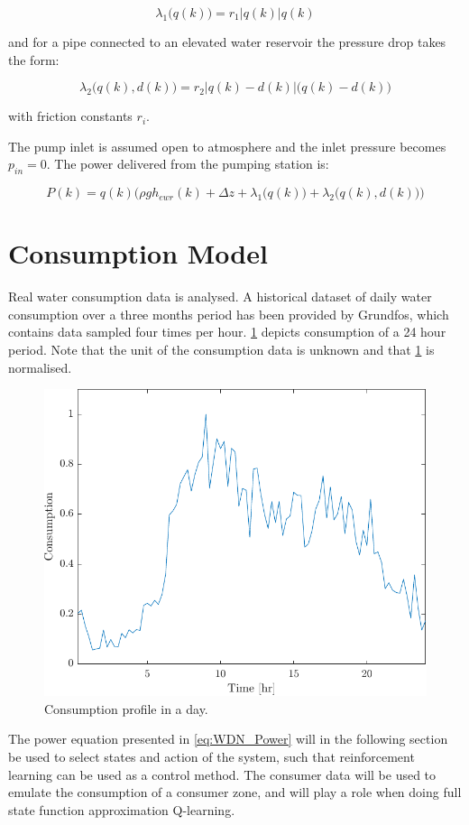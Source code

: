 \begin{equation}
	\lambda_{1}\bigg(q(k)\bigg) = r_{1}\big|q(k)\big|q(k)
\end{equation}

and for a pipe connected to an elevated water reservoir the pressure drop takes the form: 

\begin{equation}
	\lambda_{2}\bigg(q(k),d(k)\bigg) = r_{2}\big|q(k)-d(k)\big|\bigg(q(k)-d(k)\bigg) 
\end{equation}

with friction constants $ r_{i} $.

The pump inlet is assumed open to atmosphere and the inlet pressure becomes $p_{in} = 0$. The power delivered from the pumping station is:

\begin{equation}\label{eq:WDN_Power}
P(k)= q(k)\bigg(\rho g h_{ewr}(k)+\Delta{z}+\lambda_{1}\bigg(q(k)\bigg)+\lambda_{2}\bigg(q(k),d(k)\bigg) \bigg) 
\end{equation}
 
\section{Consumption Model}\label{sec:Consumption}
Real water consumption data is analysed. A historical dataset of daily water consumption over a three months period has been provided by Grundfos, which contains data sampled four times per hour. \cref{fig:Consumption} depicts consumption of a 24 hour period. Note that the unit of the consumption data is unknown and that \cref{fig:Consumption} is normalised. 

\begin{figure}[h!]
	\centering
	\includegraphics[width=0.7\linewidth]{Figures/Consumption.pdf}
	\caption{Consumption profile in a day.}
	\label{fig:Consumption}
\end{figure}

The power equation presented in \cref{eq:WDN_Power} will in the following section be used to select states and action of the system, such that reinforcement learning can be used as a control method. The consumer data will be used to emulate the consumption of a consumer zone, and will play a role when doing full state function approximation Q-learning.

\newpage